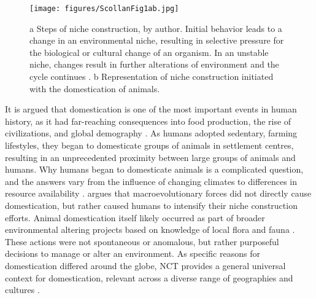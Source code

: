 	\begin{figure}[!htb]
		\texttt{[image: figures/ScollanFig1ab.jpg]}
		\caption{a Steps of niche construction, by author. Initial behavior leads to a change in an environmental niche, resulting in selective pressure for the biological or cultural change of an organism. 
In an unstable niche, changes result in further alterations of environment and the cycle continues \parencite{Rowley-Conwy_2011}. 
\newline b Representation of niche construction initiated with the domestication of animals.}
		\label{fig:ScollanFig1ab} %
	\end{figure}

It is argued that domestication is one of the most important events in human history, 
as it had far-reaching consequences into food production, 
the rise of civilizations, and global demography \parencite[700]{Diamond_2002}. 
As humans adopted sedentary, farming lifestyles, they began to domesticate groups of animals in settlement centres, resulting in an unprecedented proximity between large groups of animals and humans. 
Why humans began to domesticate animals is a complicated question, and the answers vary from the influence of changing climates to differences in resource availability 
\parencite[111--115]{Zeder_2006a}. 
\textcite[189--190]{Smith_2007} argues that macroevolutionary forces did not directly cause domestication, but rather caused humans to intensify their niche construction efforts. Animal domestication itself likely occurred as part of broader environmental altering projects based on knowledge of local flora and fauna 
\parencite[111--115]{Zeder_2006a}. 
These actions were not spontaneous or anomalous, but rather purposeful decisions to manage or alter an environment. 
As specific reasons for domestication differed around the globe,
 NCT provides a general universal context for domestication, 
relevant across a diverse range of geographies and cultures \parencite[1993--195]{Smith_2007}. 

